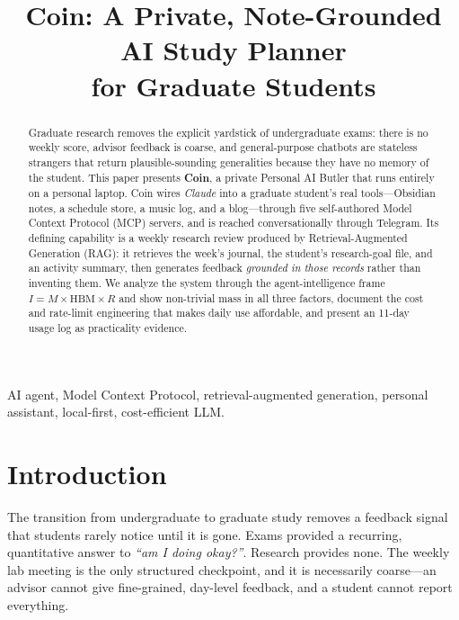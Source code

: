 \documentclass[conference]{IEEEtran}
\begin{document}
\title{Coin: A Private, Note-Grounded AI Study Planner\\ for Graduate Students}

\author{
}

\maketitle

\begin{abstract}
Graduate research removes the explicit yardstick of undergraduate exams: there
is no weekly score, advisor feedback is coarse, and general-purpose chatbots are
stateless strangers that return plausible-sounding generalities because they have
no memory of the student. This paper presents \textbf{Coin}, a private Personal AI
Butler that runs entirely on a personal laptop. Coin wires \emph{Claude} into a
graduate student's real tools---Obsidian notes, a schedule store, a music log, and
a blog---through five self-authored Model Context Protocol (MCP) servers, and is
reached conversationally through Telegram. Its defining capability is a weekly
research review produced by Retrieval-Augmented Generation (RAG): it retrieves the
week's journal, the student's research-goal file, and an activity summary, then
generates feedback \emph{grounded in those records} rather than inventing them. We
analyze the system through the agent-intelligence frame $I = M \times
\mathrm{HBM} \times R$ and show non-trivial mass in all three factors, document the
cost and rate-limit engineering that makes daily use affordable, and present an
11-day usage log as practicality evidence.
\end{abstract}

\begin{IEEEkeywords}
AI agent, Model Context Protocol, retrieval-augmented generation, personal
assistant, local-first, cost-efficient LLM.
\end{IEEEkeywords}

\section{Introduction}
The transition from undergraduate to graduate study removes a feedback signal that
students rarely notice until it is gone. Exams provided a recurring, quantitative
answer to \emph{``am I doing okay?''}. Research provides none. The weekly lab
meeting is the only structured checkpoint, and it is necessarily coarse---an
advisor cannot give fine-grained, day-level feedback, and a student cannot report
everything.
\end{document}
